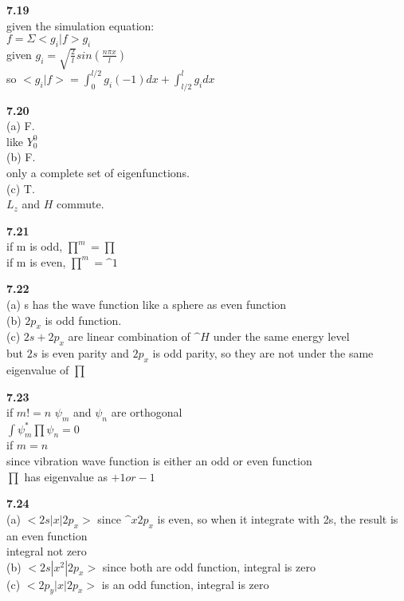 \documentclass{article}
\begin{document}
\textbf{7.19}\\
given the simulation equation:\\
$f = \Sigma<g_i|f>g_i$\\
given $g_i = \sqrt{\frac{2}{l}}sin(\frac{n\pi x}{l})$\\
so $<g_i|f> = \int_0^{l/2}g_i(-1)dx+\int_{l/2}^l g_idx$\\
\newline

\textbf{7.20}\\
(a) F. \\
like $Y^0_0$\\
(b) F.\\
only a complete set of eigenfunctions.\\
(c) T. \\
$L_z$ and $H$ commute.\\
\newline

\textbf{7.21}\\
if m is odd, $\prod^m = \prod$\\
if m is even, $\prod^m = \^{1}$\\
\newline

\textbf{7.22}\\
(a) s has the wave function like a sphere as even function\\
(b) $2p_x$ is odd function.\\
(c) $2s+2p_x$ are linear combination of $\^{H}$ under the same energy level\\
but $2s$ is even parity and $2p_x$ is odd parity, so they are not under the same eigenvalue of $\prod$\\
\newline

\textbf{7.23}\\
if $m != n$ $\psi_m$ and $\psi_n$ are orthogonal\\
$\int \psi^*_m \prod \psi_n = 0$\\
if $m = n$\\
since vibration wave function is either an odd or even function\\
$\prod$ has eigenvalue as $+1 or -1$\\
\newline

\textbf{7.24}\\
(a) $<2s|x|2p_x>$ since $\^{x}2p_x$ is even, so when it integrate with 2s, the result is an even function\\
integral not zero\\
(b) $<2s|x^2|2p_x>$ since both are odd function, integral is zero\\
(c) $<2p_y|x|2p_x>$ is an odd function, integral is zero\\
\newline
\end{document}
